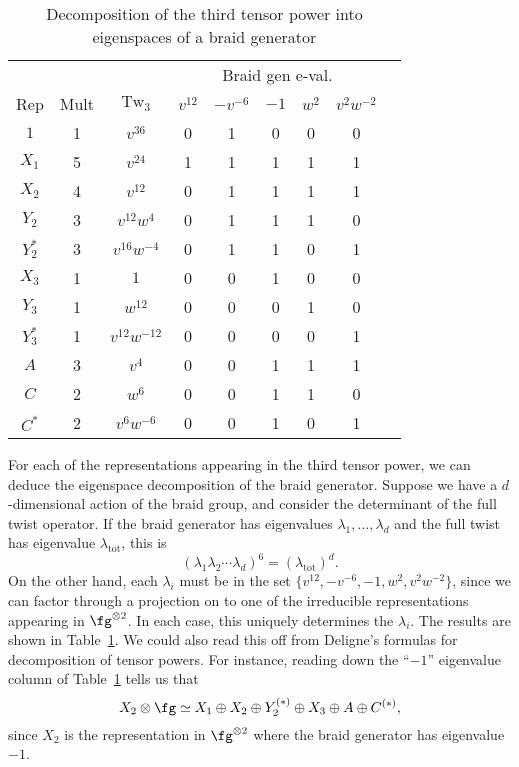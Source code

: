 \documentclass[12pt]{amsart}
\DeclareMathOperator{\Tw}{Tw}
\begin{document}
\begin{table}
  \centering
  \begin{tabular}{ccccccccc}
    \toprule
    &&&\multicolumn{5}{c}{Braid gen e-val.} \\ \cmidrule(l){4-8}
    Rep & Mult & $\Tw_3$ & $v^{12}$ & $-v^{-6}$ & $-1$ & $w^2$ & $v^2w^{-2}$ \\
    \midrule
    $1$ & 1 & $v^{36}$ & 0 & 1 & 0 & 0 & 0 \\[2pt]
    $X_1$ & 5 & $v^{24}$ & 1 & 1 & 1 & 1 & 1 \\[2pt]
    $X_2$ & 4 & $v^{12}$ & 0 & 1 & 1 & 1 & 1 \\[2pt]
    $Y_2$ & 3 & $v^{12}w^4$ & 0 & 1 & 1 & 1 & 0 \\[2pt]
    $Y_2^*$ & 3 & $v^{16}w^{-4}$ & 0 & 1 & 1 & 0 & 1 \\[2pt]
    $X_3$ & 1 & $1$ & 0 & 0 & 1 & 0 & 0 \\[2pt]
    $Y_3$ & 1 & $w^{12}$ & 0 & 0 & 0 & 1 & 0 \\[2pt]
    $Y_3^*$ & 1 & $v^{12}w^{-12}$ & 0 & 0 & 0 & 0 & 1 \\[2pt]
    $A$ & 3 & $v^4$ & 0 & 0 & 1 & 1 & 1\\[2pt]
    $C$ & 2 & $w^6$ & 0 & 0 & 1 & 1 & 0\\[2pt]
    $C^*$ & 2 & $v^6w^{-6}$ & 0 & 0 & 1 & 0 & 1\\
    \bottomrule
  \end{tabular}
  \medskip
  \caption{Decomposition of the third tensor power into eigenspaces of a braid generator}\label{tab:braid-gen}
\end{table}

For each of the representations appearing in the third tensor power,
we can deduce the eigenspace decomposition of the braid
generator. Suppose we have a $d$-dimensional action of the braid
group, and consider the determinant of the full twist operator. If the
braid generator has eigenvalues $\lambda_1,\dots,\lambda_d$ and the
full twist has eigenvalue $\lambda_{\text{tot}}$, this is
\[
(\lambda_1\lambda_2\cdots\lambda_d)^6 = (\lambda_{\text{tot}})^d.
\]
On the other hand, each $\lambda_i$ must be in the set
$\{v^{12},-v^{-6},-1,w^2,v^2w^{-2}\}$, since we can factor through a
projection on to one of the irreducible representations appearing in
$\fg^{\otimes2}$. In each case, this uniquely determines the
$\lambda_i$. The results are shown in Table~\ref{tab:braid-gen}. We
could also read this off from Deligne's formulas for decomposition of
tensor powers. For instance, reading down the ``$-1$'' eigenvalue
column of Table~\ref{tab:braid-gen} tells us that
\[
X_2 \otimes \fg \simeq X_1 \oplus X_2 \oplus Y_2^{(*)} \oplus X_3
\oplus A \oplus C^{(*)},
\]
since $X_2$ is the representation in $\fg^{\otimes2}$ where the braid
generator has eigenvalue $-1$.
\end{document}
